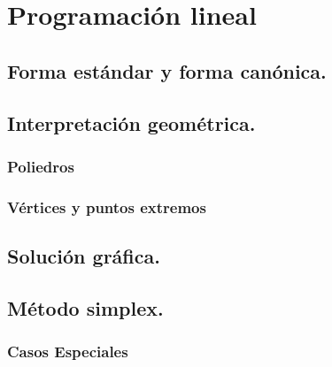 \section{Programación lineal}

\subsection{Forma estándar y forma canónica.}

\subsection{Interpretación geométrica.}

\subsubsection{Poliedros}

\subsubsection{Vértices y puntos extremos}

\subsection{Solución gráfica.}

\subsection{Método simplex.}

\subsubsection{Casos Especiales}